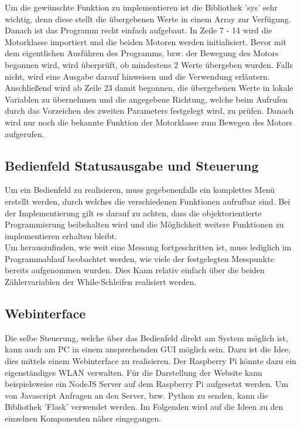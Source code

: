 Um die gewünschte Funktion zu implementieren ist die Bibliothek 'sys' sehr wichtig, denn diese stellt die übergebenen Werte in einem Array zur Verfügung. Danach ist das Programm recht einfach aufgebaut. In Zeile 7 - 14  wird die Motorklasse importiert und die beiden Motoren  werden initialisiert. Bevor mit dem eigentlichen Ausführen des Programms, bzw. der Bewegung des Motors begonnen wird, wird überprüft, ob mindestens 2 Werte übergeben wurden. Falls nicht, wird eine Ausgabe darauf hinweisen und die Verwendung erläutern. \\
Anschließend wird ab Zeile 23 damit begonnen, die übergebenen Werte in lokale Variablen zu übernehmen und die angegebene Richtung, welche beim Aufrufen durch das Vorzeichen des zweiten Parameters festgelegt wird, zu prüfen. Danach wird nur noch die bekannte Funktion der Motorklasse zum Bewegen des Motors aufgerufen.

\subsection{Bedienfeld Statusausgabe und Steuerung}
Um ein Bedienfeld zu realisieren, muss gegebenenfalls ein komplettes Menü erstellt werden, durch welches die verschiedenen Funktionen aufrufbar sind. Bei der Implementierung gilt es darauf zu achten, dass die objektorientierte Programmierung beibehalten wird und die Möglichkeit weitere Funktionen zu implementieren erhalten bleibt.\\
Um herauszufinden, wie weit eine Messung fortgeschritten ist, muss lediglich im Programmablauf beobachtet werden, wie viele der festgelegten Messpunkte bereits aufgenommen wurden. Dies Kann relativ einfach über die beiden Zählervariablen der While-Schleifen realisiert werden. 

\subsection{Webinterface}
Die selbe Steuerung, welche über das Bedienfeld direkt am System möglich ist, kann auch am PC in einem ansprechenden \ac{GUI} möglich sein. Dazu ist die Idee, dies mittels einem Webinterface zu realisieren. Der Raspberry Pi könnte dazu ein eigenständiges \ac{WLAN} verwalten. Für die Darstellung der Website kann beispielsweise ein NodeJS Server auf dem Raspberry Pi aufgesetzt werden. Um von Javascript Anfragen an den Server, bzw. Python zu senden, kann die Bibliothek 'Flask' verwendet werden. Im Folgenden wird auf die Ideen zu den einzelnen Komponenten näher eingegangen. 
